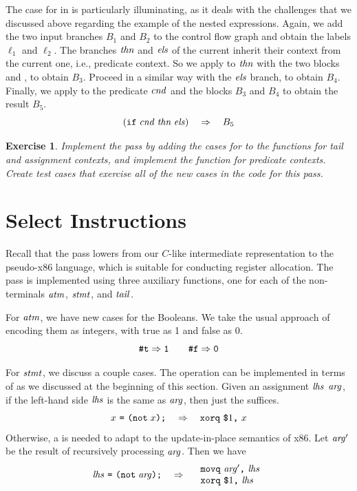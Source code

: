 \documentclass[11pt]{book}
\newtheorem{exercise}[theorem]{Exercise}
\begin{document}
The case for  in  is particularly
illuminating, as it deals with the challenges that we discussed above
regarding the example of the nested  expressions.  Again, we
add the two input branches $B_1$ and $B_2$ to the control flow graph
and obtain the labels $\ell_1$ and $\ell_2$.  The branches $\mathit{thn}$
and $\mathit{els}$ of the current  inherit their context from the
current one, i.e., predicate context. So we apply
 to $\mathit{thn}$ with the two blocks
 and , to obtain $B_3$.
Proceed in a similar way with the $\mathit{els}$ branch, to obtain $B_4$.
Finally, we apply  to
the predicate $\mathit{cnd}$ and the blocks $B_3$ and $B_4$
to obtain the result $B_5$.
\[
(\texttt{if}\; \mathit{cnd}\; \mathit{thn}\; \mathit{els})
\quad\Rightarrow\quad
B_5
\]

\begin{exercise}\normalfont
  Implement the pass  by adding the cases for
   to the functions for tail and assignment contexts, and
  implement the function for predicate contexts. Create test cases
  that exercise all of the new cases in the code for this pass.
\end{exercise}


\section{Select Instructions}
\label{sec:select-r2}

Recall that the  pass lowers from our
$C$-like intermediate representation to the pseudo-x86 language, which
is suitable for conducting register allocation. The pass is
implemented using three auxiliary functions, one for each of the
non-terminals $\mathit{atm}$, $\mathit{stmt}$, and $\mathit{tail}$.

For $\mathit{atm}$, we have new cases for the Booleans.  We take the usual
approach of encoding them as integers, with true as 1 and false as 0.
\[
\texttt{\#t} \Rightarrow \texttt{1}
\qquad
\texttt{\#f} \Rightarrow \texttt{0}
\]

For $\mathit{stmt}$, we discuss a couple cases.  The  operation can
be implemented in terms of  as we discussed at the
beginning of this section. Given an assignment
$\mathit{lhs}$ \key{=}  $\mathit{arg}$\key{);},
if the left-hand side $\mathit{lhs}$ is
the same as $\mathit{arg}$, then just the  suffices.
\[
x~\texttt{=}~ \texttt{(not}\; x\texttt{);}
\quad\Rightarrow\quad
\texttt{xorq}~\texttt{\$}1\texttt{,}~x
\]
Otherwise, a  is needed to adapt to the update-in-place
semantics of x86. Let $\mathit{arg}'$ be the result of recursively processing
$\mathit{arg}$. Then we have
\[
\mathit{lhs}~\texttt{=}~ \texttt{(not}\; \mathit{arg}\texttt{);}
\quad\Rightarrow\quad
\begin{array}{l}
\texttt{movq}~\mathit{arg}'\texttt{,}~\mathit{lhs}\\
\texttt{xorq}~\texttt{\$}1\texttt{,}~\mathit{lhs}
\end{array}
\]
\end{document}
